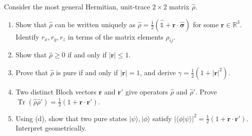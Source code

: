 \documentclass[11pt,a4paper]{article}
\begin{document}
\bigskip

\begin{tcolorbox}[ugprobbox, title={Problem 2 --- Bloch-Vector Parameterisation}]
\label{prob:CPSU.2}

Consider the most general Hermitian, unit-trace $2\times 2$ matrix $\hat{\rho}$.

\begin{enumerate}[label=(\alph*), itemsep=8pt]
  \item Show that $\hat{\rho}$ can be written uniquely as
        $\hat{\rho}=\tfrac{1}{2}(\hat{\mathbb{1}}+\mathbf{r}\cdot\hat{\boldsymbol{\sigma}})$
        for some $\mathbf{r}\in\mathbb{R}^3$.
        Identify $r_x,r_y,r_z$ in terms of the matrix elements $\rho_{ij}$.
  \item Show that $\hat{\rho}\ge 0$ if and only if $|\mathbf{r}|\le 1$.
  \item Prove that $\hat{\rho}$ is pure if and only if $|\mathbf{r}|=1$,
        and derive $\gamma=\tfrac{1}{2}(1+|\mathbf{r}|^2)$.
  \item Two distinct Bloch vectors $\mathbf{r}$ and $\mathbf{r}'$ give
        operators $\hat{\rho}$ and $\hat{\rho}'$.
        Prove $\operatorname{Tr}(\hat{\rho}\hat{\rho}')=\tfrac{1}{2}(1+\mathbf{r}\cdot\mathbf{r}')$.
  \item Using (d), show that two pure states $|\psi\rangle,|\phi\rangle$ satisfy
        $|\langle\phi|\psi\rangle|^2=\tfrac{1}{2}(1+\mathbf{r}\cdot\mathbf{r}')$.
        Interpret geometrically.
\end{enumerate}
\end{tcolorbox}

\bigskip
\end{document}
